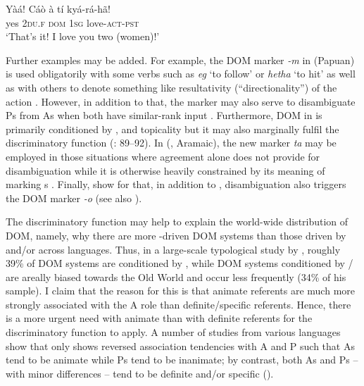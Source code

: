 \documentclass[output=paper]{langsci/langscibook}
\begin{document}
\ex
\gll Yàá!   Cáò   à   tí   kyá-rá-hã!\\
     yes   \textsc{2du.f}   \textsc{dom}  \textsc{1sg}  love-\textsc{act-pst}\\
\glt ‘That’s it! I love you two (women)!’
\z
\z

Further examples may be added. For example, the DOM marker \textit{{}-m} in  (Papuan) is used obligatorily with some verbs such as \textit{eg} ‘to follow’ or \textit{hetha} ‘to hit’ as well as with others to denote something like resultativity (“directionality”) of the action \citep[163]{Seiler1985}. However, in addition to that, the marker may also serve to disambiguate Ps from As when both have similar-rank input \citep[165]{Seiler1985}. Furthermore, DOM in  is primarily conditioned by ,  and topicality but it may also marginally fulfil the discriminatory function (\citealt{Shain2009}: 89–92). In  (, Aramaic), the new  marker \textit{ta} may be employed in those situations where agreement alone does not provide for disambiguation while it is otherwise heavily constrained by its meaning of marking s \citep[354]{Coghill2014}. Finally, \citet{KurumadaJaeger2015} show for  that, in addition to , disambiguation also triggers the DOM marker \textit{{}-o} (see also \citealt{FedzechkinaEtAl2012}).

The discriminatory function may help to explain the world-wide distribution of DOM, namely, why there are more -driven DOM systems than those driven by  and/or  across languages. Thus, in a large-scale typological study by \citet[295]{Sinnemäki2014}, roughly 39\% of DOM systems are conditioned by , while DOM systems conditioned by / are areally biased towards the Old World and occur less frequently (34\% of his sample). I claim that the reason for this is that animate referents are much more strongly associated with the A role than definite/specific referents. Hence, there is a more urgent need with animate than with definite referents for the discriminatory function to apply. A number of  studies from various languages show that only  shows reversed association tendencies with A and P such that As tend to be animate while Ps tend to be inanimate; by contrast, both As and Ps – with minor differences – tend to be definite and/or specific (\citealt{Dahl2000,Hofling2003,Everett2009,FauconnierVerstraete2014}). 
\end{document}
